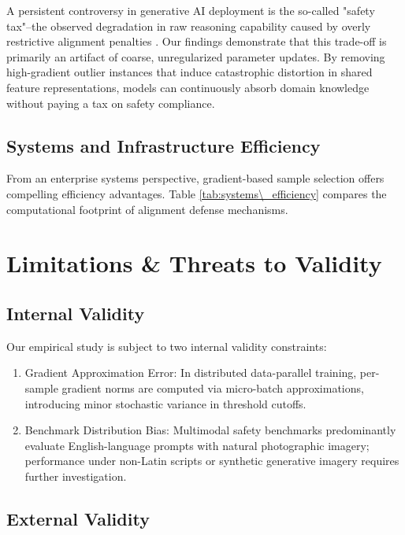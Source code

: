 \documentclass[10pt,twocolumn,letterpaper]{article}
\begin{document}
\begin{table}[t]
\begin{table}[t]
A persistent controversy in generative AI deployment is the so-called "safety tax"--the observed degradation in raw reasoning capability caused by overly restrictive alignment penalties \cite{arxiv_2406_00584}. Our findings demonstrate that this trade-off is primarily an artifact of coarse, unregularized parameter updates. By removing high-gradient outlier instances that induce catastrophic distortion in shared feature representations, models can continuously absorb domain knowledge without paying a tax on safety compliance.


\subsection{Systems and Infrastructure Efficiency}

From an enterprise systems perspective, gradient-based sample selection offers compelling efficiency advantages. Table \ref{tab:systems\_efficiency} compares the computational footprint of alignment defense mechanisms.






\section{Limitations \& Threats to Validity}



\subsection{Internal Validity}

Our empirical study is subject to two internal validity constraints:
\begin{enumerate}
  \item Gradient Approximation Error: In distributed data-parallel training, per-sample gradient norms are computed via micro-batch approximations, introducing minor stochastic variance in threshold cutoffs.
  \item Benchmark Distribution Bias: Multimodal safety benchmarks predominantly evaluate English-language prompts with natural photographic imagery; performance under non-Latin scripts or synthetic generative imagery requires further investigation.
\end{enumerate}


\subsection{External Validity}


\end{table}
\end{table}
\end{document}
